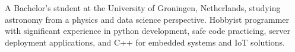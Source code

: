 

\begin{cvparagraph}

A Bachelor's student at the University of Groningen, Netherlands, studying astronomy from a physics and data science perspective. Hobbyist programmer with significant experience in python development, safe code practicing, server deployment applications, and C++ for embedded systems and IoT solutions. %
\end{cvparagraph}